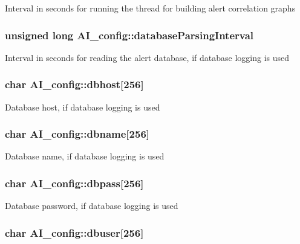\label{structAI__config_aa736375e57a59936e2e782b7cd200e41}
Interval in seconds for running the thread for building alert correlation graphs \hypertarget{structAI__config_ae6ca715cab1d90b70c3aad443133c263}{
\subsubsection[{databaseParsingInterval}]{\setlength{\rightskip}{0pt plus 5cm}unsigned long {\bf AI\_\-config::databaseParsingInterval}}}
\label{structAI__config_ae6ca715cab1d90b70c3aad443133c263}
Interval in seconds for reading the alert database, if database logging is used \hypertarget{structAI__config_a8e56f1a1b2095d3d329c8068ea0f3aab}{
\subsubsection[{dbhost}]{\setlength{\rightskip}{0pt plus 5cm}char {\bf AI\_\-config::dbhost}\mbox{[}256\mbox{]}}}
\label{structAI__config_a8e56f1a1b2095d3d329c8068ea0f3aab}
Database host, if database logging is used \hypertarget{structAI__config_ac8a93607f12106e2f5c9b43af27107da}{
\subsubsection[{dbname}]{\setlength{\rightskip}{0pt plus 5cm}char {\bf AI\_\-config::dbname}\mbox{[}256\mbox{]}}}
\label{structAI__config_ac8a93607f12106e2f5c9b43af27107da}
Database name, if database logging is used \hypertarget{structAI__config_aa1cda349763faf60b2ebdbf2d187ae7d}{
\subsubsection[{dbpass}]{\setlength{\rightskip}{0pt plus 5cm}char {\bf AI\_\-config::dbpass}\mbox{[}256\mbox{]}}}
\label{structAI__config_aa1cda349763faf60b2ebdbf2d187ae7d}
Database password, if database logging is used \hypertarget{structAI__config_aa004adebfdafb6d14092aecd7f4912b0}{
\subsubsection[{dbuser}]{\setlength{\rightskip}{0pt plus 5cm}char {\bf AI\_\-config::dbuser}\mbox{[}256\mbox{]}}}
